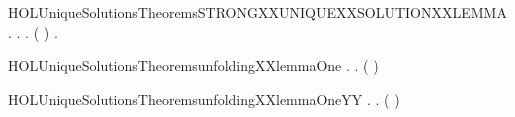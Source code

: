 \newcommand{\HOLUniqueSolutionsTheoremsSTRONGXXUNIQUEXXSOLUTION}{\UseVerbatim{HOLUniqueSolutionsTheoremsSTRONGXXUNIQUEXXSOLUTION}}
\begin{SaveVerbatim}{HOLUniqueSolutionsTheoremsSTRONGXXUNIQUEXXSOLUTIONXXLEMMA}
\HOLTokenTurnstile{} \HOLSymConst{\HOLTokenForall{}}.
         \HOLSymConst{\HOLTokenImp{}}
       \HOLSymConst{\HOLTokenForall{}}  .
             \HOLTokenTransBegin{}\HOLTokenTransEnd {} \HOLSymConst{\HOLTokenImp{}}
           \HOLSymConst{\HOLTokenExists{}}.   \HOLSymConst{\HOLTokenConj{}} ( \HOLSymConst{=}  ) \HOLSymConst{\HOLTokenConj{}} \HOLSymConst{\HOLTokenForall{}}.   \HOLTokenTransBegin{}\HOLTokenTransEnd {} 
\end{SaveVerbatim}
\newcommand{\HOLUniqueSolutionsTheoremsSTRONGXXUNIQUEXXSOLUTIONXXLEMMA}{\UseVerbatim{HOLUniqueSolutionsTheoremsSTRONGXXUNIQUEXXSOLUTIONXXLEMMA}}
\begin{SaveVerbatim}{HOLUniqueSolutionsTheoremsunfoldingXXlemmaOne}
\HOLTokenTurnstile{} \HOLSymConst{\HOLTokenForall{}}  .
         \HOLSymConst{\HOLTokenConj{}}   \HOLSymConst{\HOLTokenConj{}}     \HOLSymConst{\HOLTokenImp{}}
       \HOLSymConst{\HOLTokenForall{}}.    ( \HOLConst{\HOLTokenCompose}   ) 
\end{SaveVerbatim}
\newcommand{\HOLUniqueSolutionsTheoremsunfoldingXXlemmaOne}{\UseVerbatim{HOLUniqueSolutionsTheoremsunfoldingXXlemmaOne}}
\begin{SaveVerbatim}{HOLUniqueSolutionsTheoremsunfoldingXXlemmaOneYY}
\HOLTokenTurnstile{} \HOLSymConst{\HOLTokenForall{}}  .
         \HOLSymConst{\HOLTokenConj{}}   \HOLSymConst{\HOLTokenConj{}}     \HOLSymConst{\HOLTokenImp{}}
       \HOLSymConst{\HOLTokenForall{}}.    ( \HOLConst{\HOLTokenCompose}   ) 
\end{SaveVerbatim}
